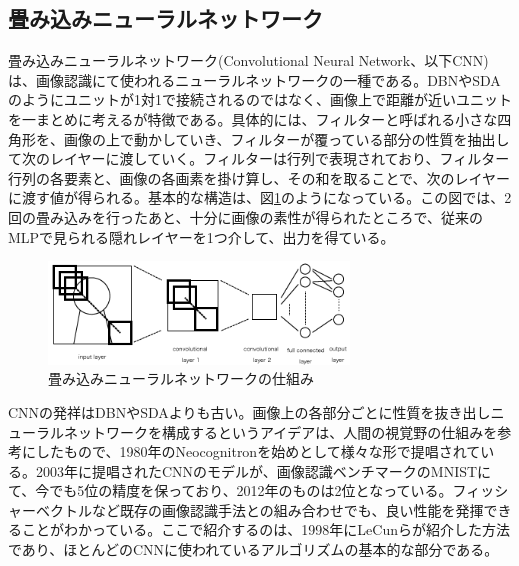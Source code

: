 \subsection{畳み込みニューラルネットワーク}
畳み込みニューラルネットワーク(Convolutional Neural Network、以下CNN)は、画像認識にて使われるニューラルネットワークの一種である。DBNやSDAのようにユニットが1対1で接続されるのではなく、画像上で距離が近いユニットを一まとめに考えるが特徴である。具体的には、フィルターと呼ばれる小さな四角形を、画像の上で動かしていき、フィルターが覆っている部分の性質を抽出して次のレイヤーに渡していく。フィルターは行列で表現されており、フィルター行列の各要素と、画像の各画素を掛け算し、その和を取ることで、次のレイヤーに渡す値が得られる。基本的な構造は、図\ref{c3_convolution}のようになっている。この図では、2回の畳み込みを行ったあと、十分に画像の素性が得られたところで、従来のMLPで見られる隠れレイヤーを1つ介して、出力を得ている。\par
\begin{figure}[tbp]
 \centering
  \includegraphics[width=80mm]{img/c3/convolution}
 \caption{畳み込みニューラルネットワークの仕組み}
 \label{c3_convolution}
\end{figure}
CNNの発祥はDBNやSDAよりも古い。画像上の各部分ごとに性質を抜き出しニューラルネットワークを構成するというアイデアは、人間の視覚野の仕組みを参考にしたもので、1980年のNeocognitronを始めとして\cite{fukushima1980neocognitron}\cite{fukushima1983neocognitron}様々な形で提唱されている\cite{lecun1998gradient-based}\cite{serre2007robust}。2003年に提唱されたCNNのモデルが、画像認識ベンチマークのMNISTにて、今でも5位の精度を保っており\cite{simard2003best}、2012年のものは2位となっている\cite{ciresan2012multi-column}。フィッシャーベクトルなど既存の画像認識手法との組み合わせでも、良い性能を発揮できることがわかっている\cite{nakayama2013efficient}。ここで紹介するのは、1998年にLeCunらが紹介した方法\cite{lecun1998gradient-based}であり、ほとんどのCNNに使われているアルゴリズムの基本的な部分である。
